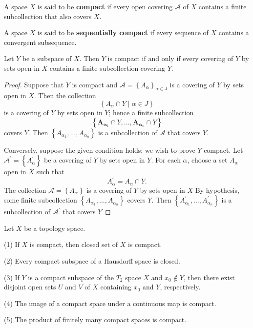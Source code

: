 \documentclass[12pt, a4paper, oneside]{book}
\begin{document}
\begin{definition}
    A space $X$ is said to be \textbf{compact} if every open covering $\mathcal{A}$ of $X$ contains a finite subcollection that also covers $X$.

    A space $X$ is said to be \textbf{sequentially compact} if every sequence of $X$ contains a convergent subsequence.
\end{definition}

\begin{theorem}
    Let $Y$ be a subspace of $X$. Then $Y$ is compact if and only if every covering of $Y$ by sets open in $X$ contains a finite subcollection covering $Y$.
    \begin{proof}
        Suppose that $Y$ is compact and $\mathcal{A}=\left\{A_\alpha\right\}_{\alpha \in J}$ is a covering of $Y$ by sets open in $X$. Then the collection
        \begin{equation*}
            \left\{A_\alpha \cap Y \mid \alpha \in J\right\}
        \end{equation*}
        is a covering of $Y$ by sets open in $Y$; hence a finite subcollection
        \begin{equation*}
            \left\{\boldsymbol{A}_{\boldsymbol{\alpha}_1} \cap Y, \ldots, \boldsymbol{A}_{\boldsymbol{\alpha}_n} \cap Y\right\}
        \end{equation*}
        covers $Y$. Then $\left\{A_{\alpha_1}, \ldots, A_{\alpha_n}\right\}$ is a subcollection of $\mathscr{A}$ that covers $Y$.

        Conversely, suppose the given condition holds; we wish to prove $Y$ compact. Let $\mathcal{A}^{\prime}=\left\{A_\alpha^{\prime}\right\}$ be a covering of $Y$ by sets open in $Y$. For each $\alpha$, choose a set $A_\alpha$ open in $X$ such that
        \begin{equation*}
            A_\alpha^{\prime}=A_\alpha \cap Y .
        \end{equation*}
        The collection $\mathcal{A}=\left\{A_\alpha\right\}$ is a covering of $Y$ by sets open in $X$ By hypothesis, some finite subcollection $\left\{A_{\alpha_1}, \ldots, A_{\alpha_n}\right\}$ covers $Y$. Then $\left\{A_{\alpha_1}^{\prime}, \ldots, A_{\alpha_n}^{\prime}\right\}$ is a subcollection of $\mathcal{A}^{\prime}$ that covers $Y$
    \end{proof}
\end{theorem}

\begin{theorem}
    Let $X$ be a topology space.

    (1) If $X$ is compact, then closed set of $X$ is compact.

    (2) Every compact subspace of a Hausdorff space is closed.

    (3) If $Y$ is a compact subspace of the $T_2$ space $X$ and $x_0 \notin Y$, then there exist disjoint open sets $U$ and $V$ of $X$ containing $x_0$ and $Y$, respectively.

    (4) The image of a compact space under a continuous map is compact.

    (5) The product of finitely many compact spaces is compact.
\end{theorem}
\end{document}
